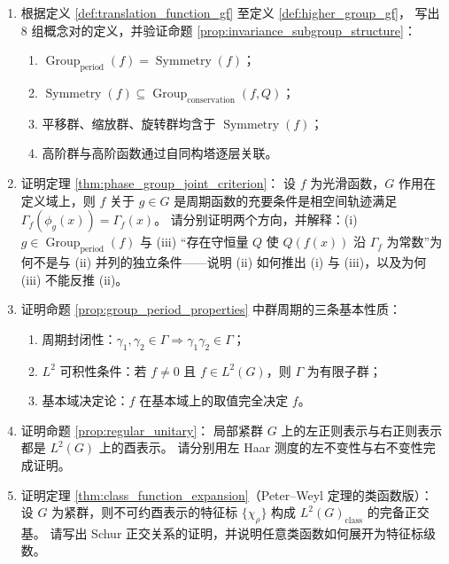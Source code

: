 \begin{enumerate}[leftmargin=3em, label=\textbf{题 \arabic*}]
    \item 根据定义 \ref{def:translation_function_gf} 至定义 \ref{def:higher_group_gf}，
    写出 8 组概念对的定义，并验证命题 \ref{prop:invariance_subgroup_structure}：
    \begin{enumerate}[label=(\roman*)]
        \item $\operatorname{Group}_{\mathrm{period}}(f)=\operatorname{Symmetry}(f)$；
        \item $\operatorname{Symmetry}(f)\subseteq\operatorname{Group}_{\mathrm{conservation}}(f,Q)$；
        \item 平移群、缩放群、旋转群均含于 $\operatorname{Symmetry}(f)$；
        \item 高阶群与高阶函数通过自同构塔逐层关联。
    \end{enumerate}

    \item 证明定理 \ref{thm:phase_group_joint_criterion}：
    设 $f$ 为光滑函数，$G$ 作用在定义域上，则 $f$ 关于 $g\in G$ 是周期函数的充要条件是相空间轨迹满足 $\Gamma_f(\phi_g(x))=\Gamma_f(x)$。
    请分别证明两个方向，并解释：(i) $g\in\operatorname{Group}_{\mathrm{period}}(f)$ 与 (iii) “存在守恒量 $Q$ 使 $Q(f(x))$ 沿 $\Gamma_f$ 为常数”为何不是与 (ii) 并列的独立条件——说明 (ii) 如何推出 (i) 与 (iii)，以及为何 (iii) 不能反推 (ii)。

    \item 证明命题 \ref{prop:group_period_properties} 中群周期的三条基本性质：
    \begin{enumerate}[label=(\roman*)]
        \item 周期封闭性：$\gamma_1,\gamma_2\in\Gamma\Rightarrow\gamma_1\gamma_2\in\Gamma$；
        \item $L^2$ 可积性条件：若 $f\neq0$ 且 $f\in L^2(G)$，则 $\Gamma$ 为有限子群；
        \item 基本域决定论：$f$ 在基本域上的取值完全决定 $f$。
    \end{enumerate}

    \item 证明命题 \ref{prop:regular_unitary}：
    局部紧群 $G$ 上的左正则表示与右正则表示都是 $L^2(G)$ 上的酉表示。
    请分别用左 Haar 测度的左不变性与右不变性完成证明。

    \item 证明定理 \ref{thm:class_function_expansion}（Peter--Weyl 定理的类函数版）：
    设 $G$ 为紧群，则不可约酉表示的特征标 $\{\chi_\rho\}$ 构成
    $L^2(G)_{\text{class}}$ 的完备正交基。
    请写出 Schur 正交关系的证明，并说明任意类函数如何展开为特征标级数。


\end{enumerate}
